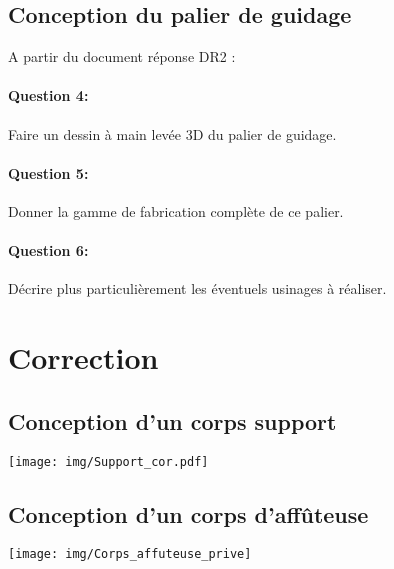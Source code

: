 \subsection{Conception du palier de guidage}

A partir du document réponse DR2 :

\paragraph{Question 4:} Faire un dessin à main levée 3D du palier de guidage.

\paragraph{Question 5:} Donner la gamme de fabrication complète de ce palier.

\paragraph{Question 6:} Décrire plus particulièrement les éventuels usinages à réaliser.






\clearpage

\ifdef{\public}{}{}

\newpage

\pagestyle{correction}

\section{Correction}

\subsection{Conception d'un corps support}

\begin{center}
\texttt{[image: img/Support\_cor.pdf]}
\end{center}

\subsection{Conception d'un corps d’affûteuse}

\begin{center}
\texttt{[image: img/Corps\_affuteuse\_prive]}
\end{center}

